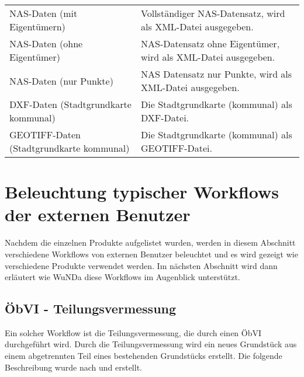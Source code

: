\begin{minipage}{\linewidth}
\centering
{} \label{tab-daten-kataster}
\begin{tabular}{|p{}|p{}|}
	\hline 
	 \rowcolor{gray} 
	\head{Produktname}  & \head{Beschreibung} \tabularnewline
	\hline 					
	\acs{NAS}-Daten (mit Eigentümern)
	&
	Vollständiger \acs{NAS}-Datensatz, wird als \acs{XML}-Datei ausgegeben. \\
	\hline
	\acs{NAS}-Daten (ohne Eigentümer)
	&
	\acs{NAS}-Datensatz ohne Eigentümer, wird als \acs{XML}-Datei ausgegeben. \\
	\hline
	\acs{NAS}-Daten (nur Punkte)
	&
	\acs{NAS} Datensatz nur Punkte, wird als \acs{XML}-Datei ausgegeben. \\
	\hline
	\acs{DXF}-Daten (Stadtgrundkarte kommunal)
	&
	Die Stadtgrundkarte (kommunal) als \acs{DXF}-Datei.  \\
	\hline
	GEOTIFF-Daten (Stadtgrundkarte kommunal)
	&
	Die Stadtgrundkarte (kommunal) als GEOTIFF-Datei. \\
	\hline	
\end{tabular}
 \end{minipage}

\section{Beleuchtung typischer Workflows der externen Benutzer}
Nachdem die einzelnen Produkte aufgelistet wurden, werden in diesem Abschnitt verschiedene Workflows von externen Benutzer beleuchtet und es wird gezeigt wie verschiedene Produkte verwendet werden. Im nächsten Abschnitt wird dann erläutert wie \ac{WuNDa} diese Workflows im Augenblick unterstützt.


\subsection{ÖbVI - Teilungsvermessung}
Ein solcher Workflow ist die Teilungsvermessung, die durch einen \ac{ÖbVI} durchgeführt wird. Durch die Teilungsvermessung wird ein neues Grundstück aus einem abgetrennten Teil eines bestehenden Grundstücks erstellt. Die folgende Beschreibung wurde nach \citeauthor{klein-vermessung} \autocite{klein-vermessung} und \citeauthor{jungemann-alltag} \autocite{jungemann-alltag} erstellt.

